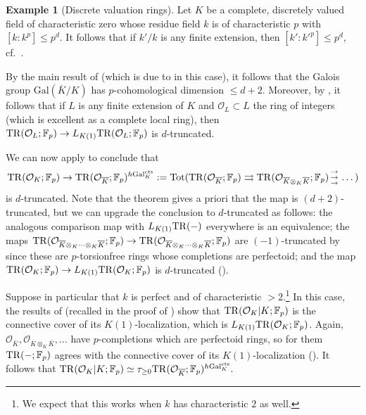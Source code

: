 \documentclass{amsart}
\newcommand{\triplearrows}{\begin{smallmatrix} \to \\ \to \\ 
\to \end{smallmatrix} }
\theoremstyle{definition}
\newtheorem{example}[theorem]{Example}
\begin{document}
\begin{example}[Discrete valuation rings] 
\label{DVRex}
Let $K$ be a complete, discretely valued field of characteristic zero whose residue field $k$
is of characteristic $p$ with $[k: k^p] \leq p^d$. 
It follows that 
if  $k'/k$ is any finite extension, then $[k':k'^p] \leq p^d$,
cf.~\cite[Lem.~2.1.1]{GO08}.

By the main result of \cite{GO08} (which is due to 
\cite{Kat82} in this case), it follows that the Galois group
$\mathrm{Gal}(\overline{K}/K)$ has $p$-cohomological dimension $\leq d + 2$. 
Moreover, by , it follows that 
if $L$ is any finite extension of $K$ and $\mathcal{O}_L \subset L$ the ring of
integers (which is excellent as a complete local ring), then 
$\mathrm{TR}( \mathcal{O}_L; \mathbb{F}_p) \to L_{K(1)} \mathrm{TR}(\mathcal{O}_L;
\mathbb{F}_p)$ is 
$d$-truncated. 


We can now apply  to conclude that
\[ \TR( \mathcal{O}_K; \mathbb{F}_p) \to
\TR(\mathcal{O}_{\overline{K}}; \mathbb{F}_p)^{h
\mathrm{Gal}_K^{\mathrm{cts}}} := \mathrm{Tot}(
\TR(\mathcal{O}_{\overline{K}}; \mathbb{F}_p) \rightrightarrows
\TR(\mathcal{O}_{\overline{K} \otimes_K \overline{K}}; \mathbb{F}_p)
\triplearrows \dots )
\]
is $d$-truncated. 
Note that the theorem gives a priori that the map is $(d+2)$-truncated, but we can
upgrade the conclusion to $d$-truncated as follows: 
the analogous comparison map with $L_{K(1)} \mathrm{TR}(-)$ everywhere is an equivalence; 
the maps  $\mathrm{TR}( \mathcal{O}_{\overline{K} \otimes_K \dots
\otimes_K\overline{K}}; \mathbb{F}_p) \to \mathrm{TR}( \mathcal{O}_{\overline{K} \otimes_K \dots
\otimes_K\overline{K}}; \mathbb{F}_p)$ are $(-1)$-truncated 
by  since these are $p$-torsionfree rings whose
completions are perfectoid; 
and the map $\mathrm{TR}(\mathcal{O}_K; \mathbb{F}_p) \to L_{K(1)} \mathrm{TR}(\mathcal{O}_K;
\mathbb{F}_p)$ is $d$-truncated (). 


Suppose in particular that $k$ is perfect and of characteristic
$>2$.\footnote{We expect that this works when $k$ has characteristic $2$ as
well.} 
In this case, the results of \cite{HM03} (recalled in 
the proof of ) 
show that 
$\mathrm{TR}(\mathcal{O}_K|K; \mathbb{F}_p)$ is the connective cover of its
$K(1)$-localization, which is $L_{K(1)} \mathrm{TR}(\mathcal{O}_K; \mathbb{F}_p)$. 
Again, $\mathcal{O}_{\overline{K}}, \mathcal{O}_{\overline{K} \otimes_K
\overline{K}}, \dots$ have $p$-completions which are perfectoid rings, so for them 
$\mathrm{TR}(-; \mathbb{F}_p)$ agrees with the connective cover of its
$K(1)$-localization (). 
It follows that
\( \mathrm{TR}(\mathcal{O}_K|K; \mathbb{F}_p) \simeq \tau_{\geq 0}
\mathrm{TR}(\mathcal{O}_{\overline{K}} ; \mathbb{F}_p)^{h \mathrm{Gal}_K^{\mathrm{cts}}}
.\)
\end{example} 
\end{document}
